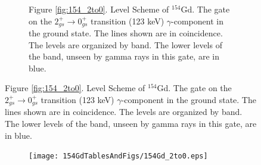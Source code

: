 \begin{landscape}
\begin{figure}[!]
    \centering
    \label{fig:154_2to0}
    \begin{subfigure}{1.4\textwidth}
    \caption*{\centering \fontsize{10pt}{12pt}Figure \ref{fig:154_2to0}. Level Scheme of $^{154}$Gd. The gate on the $2_{gs}^+\rightarrow 0_{gs}^+$ transition (123 keV) $\gamma$-component in the ground state. The lines shown are in coincidence. The levels are organized by band. The lower levels of the band, unseen by gamma rays in this gate, are in blue.}
    \end{subfigure}
\end{figure}
\clearpage
\begin{figure}
    \ContinuedFloat
    \begin{subfigure}{1.4\textwidth}
    \texttt{[image: 154GdTablesAndFigs/154Gd\_2to0.eps]}
    \label{fig:154_2to0level}
    \end{subfigure}
\end{figure}
\end{landscape}

